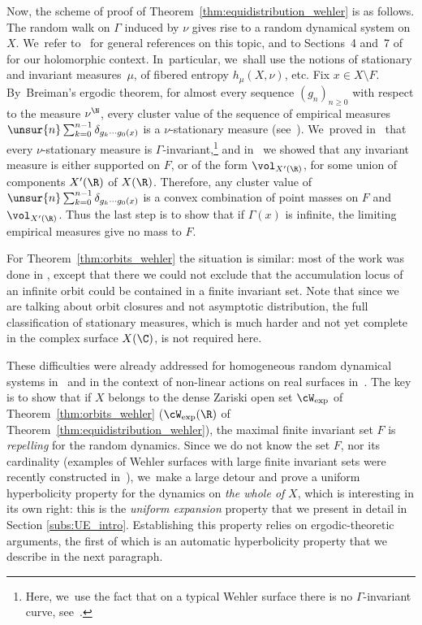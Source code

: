 Now, the scheme of proof of Theorem~\ref{thm:equidistribution_wehler} is as follows.
The random walk on $\Gamma$ induced by $\nu$ gives rise to a random dynamical system on $X$. We~refer to~\cite{Kifer, br} for general references on this topic,
and to Sections~4 and~7 of \cite{stiffness} for our holomorphic context. In~particular, we~shall use the notions of stationary and invariant measures~$\mu$, of fibered entropy $h_\mu(X,\nu)$, etc.
Fix $x\in X\setminus F$. By~Breiman's ergodic theorem, for almost every sequence $(g_n)_{n\geq 0}$ with respect to the measure $\nu^\N$,
every cluster value of the sequence of
empirical measures
$\unsur{n} \sum_{k=0}^{n-1} \delta_{g_k\cdots g_0(x)}$ is a $\nu$-stationary measure (see~\cite[\S 2.2]{benoist-quint_book}). We~proved in~\cite{stiffness} that every $\nu$-stationary measure is $\Gamma$-invariant,\footnote{Here, we~use the fact that on
a typical Wehler surface there is no $\Gamma$-invariant curve, see~\cite[Lem.\,2.3]{finite_orbits}.}
and in~\cite{invariant} we showed that any invariant measure is either supported on $F$, or of the
form $\vol_{X'(\R)}$, for some union of components $X'(\R)$ of $X(\R)$. Therefore, any cluster value of
$\unsur{n} \sum_{k=0}^{n-1} \delta_{g_k\cdots g_0(x)}$ is a convex combination of point masses on $F$ and
$\vol_{X'(\R)}$. Thus the last step is to show that if $\Gamma(x)$ is infinite, the limiting empirical
measures give no mass to $F$.

For Theorem~\ref{thm:orbits_wehler} the situation is similar:
most of the work was done in \cite[\S 8]{invariant}, except that there we could not exclude
that the accumulation locus of an infinite orbit could be contained in a finite invariant set.
Note that since we are talking about orbit closures and not asymptotic distribution,
the full classification of stationary measures,
which is much harder and not yet complete in the
complex surface $X(\C)$, is not required here.

These difficulties were already addressed for homogeneous random dynamical systems in~\cite{benoist-quint3, Eskin-Lindenstrauss:RandomWalk} and in the context of non-linear actions on real
surfaces in~\cite{liu_thesis, chung}.
The key is to show that if $X$ belongs to the
dense Zariski open set $ \cW_{\mathrm{exp}}$ of Theorem~\ref{thm:orbits_wehler}
(\resp $ \cW_{\mathrm{exp}}(\R)$ of Theorem~\ref{thm:equidistribution_wehler}), the maximal finite invariant set
$F$ is \emph{repelling} for the random dynamics. Since we do not know the set $F$, nor its cardinality (examples of Wehler surfaces with large finite invariant sets were recently constructed
in~\cite{fuchs-litman-silverman-tran}), we~make a large detour and prove a uniform
hyperbolicity property for
the dynamics on \emph{the whole of} $X$, which is interesting in its own right: this is the \emph{uniform expansion} property that we present in detail in Section \ref{subs:UE_intro}.
Establishing this property relies on ergodic-theoretic arguments, the first of which is an
automatic hyperbolicity property that we describe in the next paragraph.

